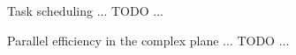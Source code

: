 \documentclass[11pt,aspectratio=43]{beamer}
\newcommand{\matr}[1]{\mathbf{#1}}
\newcommand{\vect}[1]{\boldsymbol{#1}}
\newcommand{\uvect}{\vect{u}}
\newcommand{\TFtoC}{\matr{T}_F^C}
\newcommand{\TCtoF}{\matr{T}_C^F}
\newcommand{\eyeMat}{\matr{I}}
\newcommand{\phiOp}{\bm{\phi}}
\newcommand{\chiOp}{\bm{\chi}}
\newcommand{\phiApprox}{\bm{\tilde{\phi}}}
\newcommand{\CoarseId}{C}
\newcommand{\phiApproxCoarse}{\bm{\tilde{\phi}}_\CoarseId}
\begin{document}
\begin{frame}{Task scheduling}
	... TODO ...
\end{frame}

\begin{frame}{Parallel efficiency in the complex plane}
	... TODO ...
\end{frame}


\end{document}
